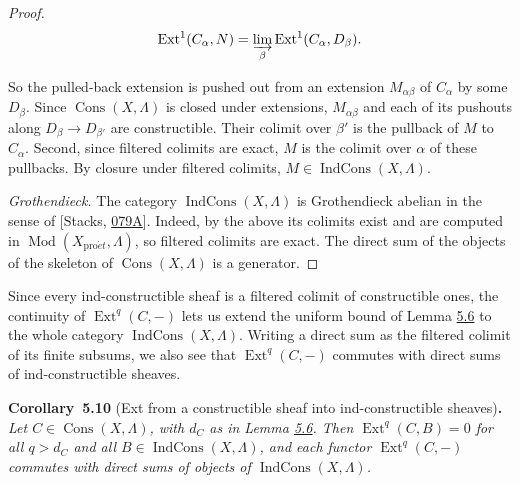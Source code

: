 \documentclass[11pt]{article}
\newenvironment{bpstatement}[2]{\par\addvspace{0.6\baselineskip}\noindent\textbf{#1}#2\textbf{.}\enspace\ignorespaces}
  {\par\addvspace{0.4\baselineskip}}
\newenvironment{bpstatementit}[2]{\begin{bpstatement}{#1}{#2}\itshape\ignorespaces}{\end{bpstatement}}
\providecommand{\Cons}{}\renewcommand{\Cons}{\operatorname{Cons}}
\providecommand{\Ext}{}\renewcommand{\Ext}{\operatorname{Ext}}
\providecommand{\IndCons}{}\renewcommand{\IndCons}{\operatorname{IndCons}}
\begin{document}
\begin{proof}[{Proof}]
\[
\Ext^1(C_\alpha,N)
=\varinjlim_\beta\Ext^1(C_\alpha,D_\beta).
\]

So the pulled-back extension is pushed out from an extension \(M_{\alpha\beta}\) of \(C_\alpha\) by some \(D_\beta\). Since \(\Cons(X,\Lambda)\) is closed under extensions, \(M_{\alpha\beta}\) and each of its pushouts along \(D_\beta\to D_{\beta'}\) are constructible. Their colimit over \(\beta'\) is the pullback of \(M\) to \(C_\alpha\). Second, since filtered colimits are exact, \(M\) is the colimit over \(\alpha\) of these pullbacks. By closure under filtered colimits, \(M\in\IndCons(X,\Lambda)\).

\emph{Grothendieck.} The category \(\IndCons(X,\Lambda)\) is Grothendieck abelian in the sense of [Stacks, \href{https://stacks.math.columbia.edu/tag/079A}{079A}]. Indeed, by the above its colimits exist and are computed in \(\operatorname{Mod}(X_{\mathrm{pro}\acute{e}t},\Lambda)\), so filtered colimits are exact. The direct sum of the objects of the skeleton of \(\Cons(X,\Lambda)\) is a generator.
\end{proof}

\label{bp29}%
Since every ind-constructible sheaf is a filtered colimit of constructible ones, the continuity of \(\Ext^q(C,-)\) lets us extend the uniform bound of Lemma \hyperref[bp20]{5.6} to the whole category \(\IndCons(X,\Lambda)\). Writing a direct sum as the filtered colimit of its finite subsums, we also see that \(\Ext^q(C,-)\) commutes with direct sums of ind-constructible sheaves.

\label{bp30}%
\begin{bpstatementit}{Corollary~5.10}{ (Ext from a constructible sheaf into ind-constructible sheaves)}
Let \(C\in\Cons(X,\Lambda)\), with \(d_C\) as in Lemma \hyperref[bp20]{5.6}. Then \(\Ext^q(C,B)=0\) for all \(q>d_C\) and all \(B\in\IndCons(X,\Lambda)\), and each functor \(\Ext^q(C,-)\) commutes with direct sums of objects of \(\IndCons(X,\Lambda)\).
\end{bpstatementit}
\end{document}
